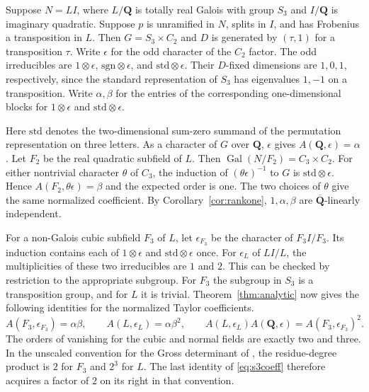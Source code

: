 \documentclass[11pt]{amsart}
\numberwithin{equation}{section}
\theoremstyle{definition}
\theoremstyle{remark}
\newcommand{\Q}{\mathbf Q}
\newcommand{\Qbar}{\overline{\mathbf Q}}
\newcommand{\Gal}{\operatorname{Gal}}
\begin{document}
Suppose $N=L I$, where $L/\Q$ is totally real Galois with
group $S_3$ and $I/\Q$ is imaginary quadratic. Suppose $p$
is unramified in $N$, splits in $I$, and has Frobenius a
transposition in $L$. Then $G=S_3\times C_2$ and $D$
is generated by $(\tau,1)$ for a transposition $\tau$.
Write $\epsilon$ for the odd character of the $C_2$ factor.
The odd irreducibles are $1\otimes\epsilon$,
$\mathrm{sgn}\otimes\epsilon$, and
$\mathrm{std}\otimes\epsilon$. Their $D$-fixed dimensions
are $1,0,1$, respectively, since the standard representation
of $S_3$ has eigenvalues $1,-1$ on a transposition.
Write $\alpha,\beta$ for the entries of the corresponding
one-dimensional blocks for $1\otimes\epsilon$ and
$\mathrm{std}\otimes\epsilon$.

Here $\mathrm{std}$ denotes the two-dimensional sum-zero summand
of the permutation representation on three letters.
As a character of $G$ over $\Q$, $\epsilon$ gives
$A(\Q,\epsilon)=\alpha$. Let $F_2$ be the real quadratic
subfield of $L$. Then $\Gal(N/F_2)=C_3\times C_2$.
For either nontrivial character $\theta$ of $C_3$, the
induction of $(\theta\epsilon)^{-1}$ to $G$ is
$\mathrm{std}\otimes\epsilon$. Hence
$A(F_2,\theta\epsilon)=\beta$ and the expected order is one.
The two choices of $\theta$ give the same normalized coefficient.
By Corollary~\ref{cor:rankone}, $1,\alpha,\beta$ are
$\Qbar$-linearly independent.

For a non-Galois cubic subfield $F_3$ of $L$, let
$\epsilon_{F_3}$ be the character of $F_3I/F_3$. Its
induction contains each of $1\otimes\epsilon$ and
$\mathrm{std}\otimes\epsilon$ once. For $\epsilon_L$ of
$LI/L$, the multiplicities of these two irreducibles
are $1$ and $2$. This can be checked by restriction to
the appropriate subgroup. For $F_3$ the subgroup in
$S_3$ is a transposition group, and for $L$ it is
trivial. Theorem~\ref{thm:analytic} now gives the
following identities for the normalized Taylor coefficients.
\begin{equation}\label{eq:s3coeff}
 A(F_3,\epsilon_{F_3})=\alpha\beta,\qquad
 A(L,\epsilon_L)=\alpha\beta^2,\qquad
 A(L,\epsilon_L)A(\Q,\epsilon)=A(F_3,\epsilon_{F_3})^2 .
\end{equation}
The orders of vanishing for the cubic and normal fields
are exactly two and three. In the unscaled convention
for the Gross determinant of \cite[eq.~(8)]{DKV}, the
residue-degree product is $2$ for $F_3$ and $2^3$ for
$L$. The last identity of \eqref{eq:s3coeff} therefore
acquires a factor of $2$ on its right in that convention.
\end{document}
